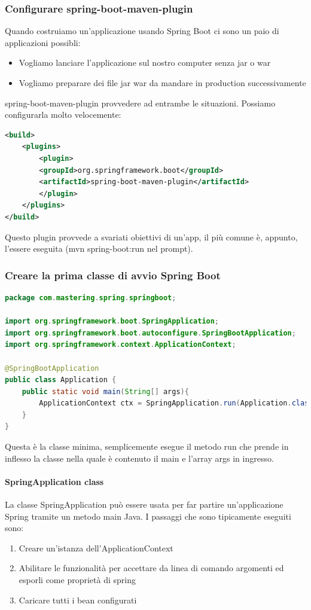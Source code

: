 \documentclass[11pt,a4paper]{book}
\begin{document}
\subsubsection{Configurare spring-boot-maven-plugin}
Quando costruiamo un'applicazione usando Spring Boot ci sono un paio di applicazioni possibli:
\begin{itemize}
	\item Vogliamo lanciare l'applicazione sul nostro computer senza jar o war
	\item Vogliamo preparare dei file jar  war da mandare in production successivamente
\end{itemize}

spring-boot-maven-plugin provvedere ad entrambe le situazioni. Possiamo configurarla molto velocemente:
\begin{lstlisting}[language = XML]
<build>
	<plugins>
		<plugin>
		<groupId>org.springframework.boot</groupId>
		<artifactId>spring-boot-maven-plugin</artifactId>
		</plugin>
	</plugins>
</build>
\end{lstlisting}

Questo plugin provvede a svariati obiettivi di un'app, il più comune è, appunto, l'essere eseguita (mvn spring-boot:run nel prompt).

\subsubsection{Creare la prima classe di avvio Spring Boot}
\begin{lstlisting}[language = Java]
package com.mastering.spring.springboot;

import org.springframework.boot.SpringApplication;
import org.springframework.boot.autoconfigure.SpringBootApplication;
import org.springframework.context.ApplicationContext;

@SpringBootApplication 
public class Application {
	public static void main(String[] args){
		ApplicationContext ctx = SpringApplication.run(Application.class, args);
	}
}
\end{lstlisting}
Questa è la classe minima, semplicemente esegue il metodo run che prende in inflesso la classe nella quale è contenuto il main e l'array args in ingresso.

\paragraph{SpringApplication class}
La classe SpringApplication può essere usata per far partire un'applicazione Spring tramite un metodo main Java. I passaggi che sono tipicamente eseguiti sono:
\begin{enumerate}
	\item Creare un'istanza dell'ApplicationContext
	\item Abilitare le funzionalità per accettare da linea di comando argomenti ed esporli come proprietà di spring
	\item Caricare tutti i bean configurati
\end{enumerate}
\end{document}
